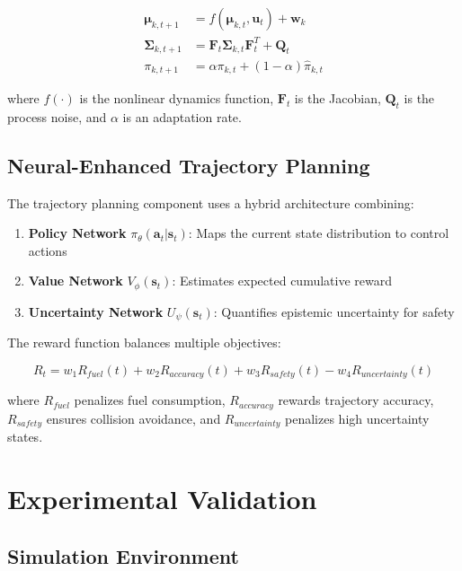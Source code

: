 \documentclass{article}
\begin{document}
\begin{align}
\boldsymbol{\mu}_{k,t+1} &= f(\boldsymbol{\mu}_{k,t}, \mathbf{u}_t) + \mathbf{w}_k \\
\boldsymbol{\Sigma}_{k,t+1} &= \mathbf{F}_t \boldsymbol{\Sigma}_{k,t} \mathbf{F}_t^T + \mathbf{Q}_t \\
\pi_{k,t+1} &= \alpha \pi_{k,t} + (1-\alpha) \hat{\pi}_{k,t}
\label{eq:gmm_evolution}
\end{align}

where $f(\cdot)$ is the nonlinear dynamics function, $\mathbf{F}_t$ is the Jacobian, $\mathbf{Q}_t$ is the process noise, and $\alpha$ is an adaptation rate.

\subsection{Neural-Enhanced Trajectory Planning}

The trajectory planning component uses a hybrid architecture combining:

\begin{enumerate}
\item \textbf{Policy Network} $\pi_\theta(\mathbf{a}_t | \mathbf{s}_t)$: Maps the current state distribution to control actions
\item \textbf{Value Network} $V_\phi(\mathbf{s}_t)$: Estimates expected cumulative reward
\item \textbf{Uncertainty Network} $U_\psi(\mathbf{s}_t)$: Quantifies epistemic uncertainty for safety
\end{enumerate}

The reward function balances multiple objectives:

\begin{equation}
R_t = w_1 R_{fuel}(t) + w_2 R_{accuracy}(t) + w_3 R_{safety}(t) - w_4 R_{uncertainty}(t)
\label{eq:reward}
\end{equation}

where $R_{fuel}$ penalizes fuel consumption, $R_{accuracy}$ rewards trajectory accuracy, $R_{safety}$ ensures collision avoidance, and $R_{uncertainty}$ penalizes high uncertainty states.

\section{Experimental Validation}

\subsection{Simulation Environment}
\end{document}
